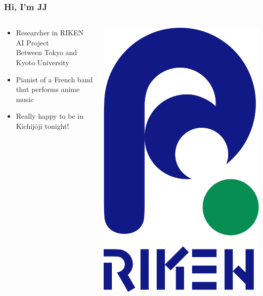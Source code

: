 \documentclass[]{beamer}
\begin{document}
\begin{frame}
  \frametitle{Hi, I'm JJ}
  \begin{columns}
  \begin{column}{0.7\textwidth}
    \begin{itemize}[<+->]
      \item Researcher in RIKEN AI Project\\
      Between Tokyo and Kyoto University
      \vspace{1.5cm}
      \item Pianist of a French band that performs anime music\\
      \vspace{1.5cm}
      \item Really happy to be in Kichij\= oji tonight!\\
    \end{itemize}
  \end{column}
  \begin{column}{0.3\textwidth}
  \centering
  \includegraphics[width=0.4\linewidth]{figures/riken.png}\\[5mm]
\end{column}
\end{columns}
\end{frame}
\end{document}
